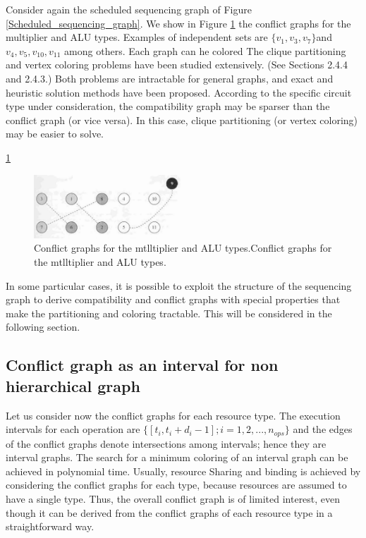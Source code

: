 Consider again the scheduled sequencing graph of Figure \ref{Scheduled_sequencing_graph}. We show in Figure \ref{fig:Conflict_graphs_for_the_mtlltiplier_and_ALU_types} the conflict graphs for the multiplier and ALU types. Examples of independent sets are $\{v_{1},v_{3},v_{7}\}  $and$ v_{4},v_{5},v_{10},v_{11} $ among others. Each graph can he colored The clique partitioning and vertex coloring problems have been studied extensively. (See Sections 2.4.4 and 2.4.3.) Both problems are intractable for general graphs, and exact and heuristic solution methods have been proposed. According to the specific circuit type under consideration, the compatibility graph may be sparser than the conflict graph (or vice versa). In this case, clique partitioning (or vertex coloring) may be easier to solve. 


\ref{fig:Conflict_graphs_for_the_mtlltiplier_and_ALU_types}
\begin{figure}[h]
    \centering
    \includegraphics[width=0.5\textwidth]{Conflict_graphs_for_the_mtlltiplier_and_ALU_types}
    \caption{Conflict graphs for the mtlltiplier and ALU types.Conflict graphs for the mtlltiplier and ALU types. \cite{b1}}
    \label{fig:Conflict_graphs_for_the_mtlltiplier_and_ALU_types}
\end{figure}


In some particular cases, it is possible to exploit the structure of the sequencing graph to derive compatibility and conflict graphs with special properties that make the partitioning and coloring tractable. This will be considered in the following section.



\subsection{Conflict graph as an interval for non hierarchical graph}


Let us consider now the conflict graphs for each resource type. The execution intervals for each operation are $ \{[t_{i},t_{i}+d_{i}-1];i=1,2,...,n_{ops}\} $ and the edges of the conflict graphs denote intersections among intervals; hence they are interval graphs. The search for a minimum coloring of an interval graph can be achieved in polynomial time.  Usually, resource Sharing and binding is achieved by considering the conflict graphs for each type, because resources are assumed to have a single type. Thus, the overall conflict graph is of limited interest, even though it can be derived from the conflict graphs of each resource type in a straightforward way.

